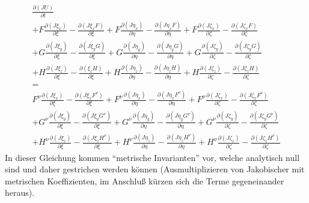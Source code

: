 \begin{align*}
\frac{\partial \left( JU\right)}{\partial t}
\\
+F\frac{\partial \left(J\xi_x\right)}{\partial \xi}-\frac{\partial \left(J\xi_x F\right)}{\partial \xi}+F\frac{\partial \left(J\eta_x\right)}{\partial \eta}-\frac{\partial \left(J\eta_x F\right)}{\partial \eta}+F\frac{\partial \left(J\zeta_x\right)}{\partial \zeta}-\frac{\partial \left(J\zeta_x F\right)}{\partial \zeta}
\\
+G\frac{\partial \left(J\xi_y\right)}{\partial \xi}-\frac{\partial \left(J\xi_y G\right)}{\partial \xi}+G\frac{\partial \left(J\eta_y\right)}{\partial \eta}-\frac{\partial \left(J\eta_y G\right)}{\partial \eta}+G\frac{\partial \left(J\zeta_y\right)}{\partial \zeta}-\frac{\partial \left(J\zeta_y G\right)}{\partial \zeta}
\\
+H\frac{\partial \left(J\xi_z\right)}{\partial \xi}-\frac{\partial \left(\xi_z H\right)}{\partial \xi}+H\frac{\partial \left(J\eta_z\right)}{\partial \eta}-\frac{\partial \left(J\eta_z H\right)}{\partial \eta}+H\frac{\partial \left(J\zeta_z\right)}{\partial \zeta}-\frac{\partial \left(J\zeta_z H\right)}{\partial \zeta}
\\
=
\\
F^\nu\frac{\partial \left(J\xi_x\right)}{\partial \xi}-\frac{\partial \left(J\xi_x F^\nu\right)}{\partial \xi}+F^\nu\frac{\partial \left(J\eta_x\right)}{\partial \eta}-\frac{\partial \left(J\eta_x F^\nu\right)}{\partial \eta}+F^\nu\frac{\partial \left(J\zeta_x\right)}{\partial \zeta}-\frac{\partial \left(J\zeta_x F^\nu\right)}{\partial \zeta}
\\
+G^\nu\frac{\partial \left(J\xi_y\right)}{\partial \xi}-\frac{\partial \left(J\xi_y G^\nu\right)}{\partial \xi}+G^\nu\frac{\partial \left(J\eta_y\right)}{\partial \eta}-\frac{\partial \left(J\eta_y G^\nu\right)}{\partial \eta}+G^\nu\frac{\partial \left(J\zeta_y\right)}{\partial \zeta}-\frac{\partial \left(J\zeta_y G^\nu\right)}{\partial \zeta}
\\
+H^\nu\frac{\partial \left(J\xi_z\right)}{\partial \xi}-\frac{\partial \left(J\xi_z H^\nu\right)}{\partial \xi}+H^\nu\frac{\partial \left(J\eta_z\right)}{\partial \eta}-\frac{\partial \left(J\eta_z H^\nu\right)}{\partial \eta}+H^\nu\frac{\partial \left(J\zeta_z\right)}{\partial \zeta}-\frac{\partial \left(J\zeta_z H^\nu\right)}{\partial \zeta}
\end{align*}
In dieser Gleichung kommen ``metrische Invarianten'' vor, welche analytisch null sind und daher gestrichen werden können 
(Ausmultiplizieren von Jakobischer mit metrischen Koeffizienten, im Anschluß kürzen sich die Terme gegeneinander heraus).
